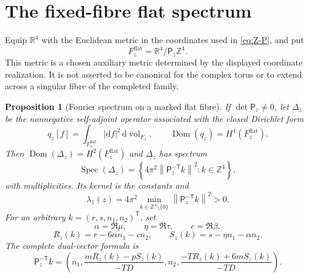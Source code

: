 \documentclass[11pt]{article}
\numberwithin{equation}{section}
\newtheorem{proposition}[theorem]{Proposition}
\theoremstyle{definition}
\theoremstyle{remark}
\newcommand{\R}{\mathbb R}
\newcommand{\Z}{\mathbb Z}
\newcommand{\Spec}{\operatorname{Spec}}
\newcommand{\dd}{\mathrm d}
\begin{document}
\section{The fixed-fibre flat spectrum}

Equip $\R^4$ with the Euclidean metric in the coordinates used in \eqref{eq:Z-P}, and put
\begin{equation}\label{eq:flat-fibre}
 F_z^{\mathrm{flat}}=\R^4/\mathsf P_z\Z^4.
\end{equation}
This metric is a chosen auxiliary metric determined by the displayed coordinate realization.  It is not asserted to be canonical for the complex torus or to extend across a singular fibre of the completed family.

\begin{proposition}[Fourier spectrum on a marked flat fibre]\label{prop:fixed-spectrum}
If $\det\mathsf P_z\ne0$, let $\Delta_z$ be the nonnegative self-adjoint
operator associated with the closed Dirichlet form
\[
 q_z[f]=\int_{F_z^{\mathrm{flat}}}|\dd f|^2\,
 \dd\operatorname{vol}_{F_z},\qquad \operatorname{Dom}(q_z)=H^1(F_z^{\mathrm{flat}}).
\]
Then $\operatorname{Dom}(\Delta_z)=H^2(F_z^{\mathrm{flat}})$ and
$\Delta_z$ has spectrum
\begin{equation}\label{eq:fixed-spectrum}
 \Spec(\Delta_z)=
 \left\{4\pi^2\left\lVert\mathsf P_z^{-\mathsf T}k\right\rVert^2:
 k\in\Z^4\right\},
\end{equation}
with multiplicities.  Its kernel is the constants and
\begin{equation}\label{eq:fixed-gap}
 \lambda_1(z)=4\pi^2
 \min_{k\in\Z^4\setminus\{0\}}
 \left\lVert\mathsf P_z^{-\mathsf T}k\right\rVert^2>0.
\end{equation}
For an arbitrary $k=(r,s,n_1,n_2)^{\mathsf T}$, set
\[
 \alpha=\Re\mu,\qquad \eta=\Re\tau,\qquad c=\Re\beta,
\]
\begin{equation}\label{eq:shifted-Fourier-indices}
 R_z(k)=r-6\alpha n_1-cn_2,
 \qquad S_z(k)=s-\eta n_1-\alpha n_2.
\end{equation}
The complete dual-vector formula is
\begin{equation}\label{eq:complete-dual-vector}
 \mathsf P_z^{-\mathsf T}k
 =\left(n_1,
 \frac{mR_z(k)-pS_z(k)}{-TD},n_2,
 \frac{-TR_z(k)+6mS_z(k)}{-TD}\right).
\end{equation}
\end{proposition}
\end{document}
